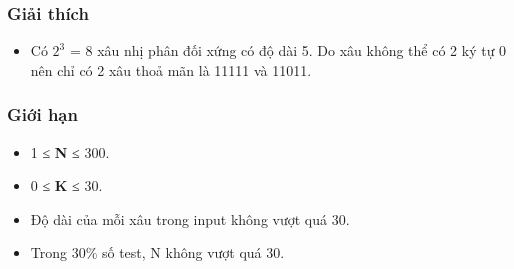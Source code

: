 \subsubsection{Giải thích}
\begin{itemize}
	\item Có $2^{3}$ = 8 xâu nhị phân đối xứng có độ dài 5. Do xâu không thể có 2 ký tự 0 nên chỉ có 2 xâu thoả mãn là 11111 và 11011.
\end{itemize}

\subsubsection{Giới hạn}
\begin{itemize}
	\item 1 ≤ \textbf{ N } ≤ 300.
	\item 0 ≤ \textbf{ K } ≤ 30.
	\item Độ dài của mỗi xâu trong input không vượt quá 30.
	\item Trong 30\% số test, N không vượt quá 30.
\end{itemize}

